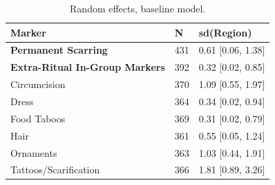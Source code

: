 \begin{table}[!ht]
\centering
\small
\caption{Random effects, baseline model.}
\label{tab:ext_random_effects_baseline}
\begin{tabular}{lll}
\toprule
Marker & N & sd(Region) \\
\midrule
\textbf{Permanent Scarring} & 431 & 0.61 [0.06, 1.38] \\
\textbf{Extra-Ritual In-Group Markers} & 392 & 0.32 [0.02, 0.85] \\
\midrule
Circumcision & 370 & 1.09 [0.55, 1.97] \\
Dress & 364 & 0.34 [0.02, 0.94] \\
Food Taboos & 369 & 0.31 [0.02, 0.79] \\
Hair & 361 & 0.55 [0.05, 1.24] \\
Ornaments & 363 & 1.03 [0.44, 1.91] \\
Tattoos/Scarification & 366 & 1.81 [0.89, 3.26] \\
\bottomrule
\end{tabular}
\end{table}